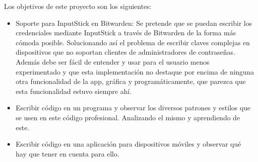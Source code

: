 Los objetivos de este proyecto son los siguientes:
\begin{itemize}
    \item Soporte para InputStick en Bitwarden: Se pretende que se puedan escribir los credenciales mediante InputStick a través de Bitwarden de la forma más cómoda posible. Solucionando así el problema de escribir claves complejas en dispositivos que no soportan clientes de administradores de contraseñas. Además debe ser fácil de entender y usar para el usuario menos experimentado y que esta implementación no destaque por encima de ninguna otra funcionalidad de la app, gráfica y programáticamente, que parezca que esta funcionalidad estuvo siempre ahí.
    \item Escribir código en un programa  y observar los diversos patrones y estilos que se usen en este código profesional. Analizando el mismo y aprendiendo de este.
    \item Escribir código en una aplicación para dispositivos móviles y observar qué hay que tener en cuenta para ello.
\end{itemize}
